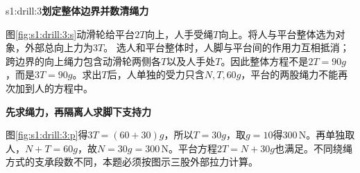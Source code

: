 \begin{drillsolution}{s1:drill:3}\textbf{划定整体边界并数清绳力}\par\nobreak
图\ref{fig:s1:drill:3:s}动滑轮给平台$2T$向上，人手受绳$T$向上。将人与平台整体选为对象，外部总向上力为$3T$。
选人和平台整体时，人脚与平台间的作用力互相抵消；跨边界的向上绳力包含动滑轮两侧各$T$以及人手处$T$。因此整体方程不是$2T=90g$，而是$3T=90g$。求出$T$后，人单独的受力只含$N,T,60g$，平台的两股绳力不能再次加到人的方程中。



\par\medskip{}\noindent\textbf{先求绳力，再隔离人求脚下支持力}\par\nobreak
图\ref{fig:s1:drill:3:p}得$3T=(60+30)g$，所以$T=30g$，取$g=10$得$300\,\mathrm N$。再单独取人，$N+T=60g$，故$N=30g=300\,\mathrm N$。平台方程$2T=N+30g$也满足。不同绕绳方式的支承段数不同，本题必须按图示三股外部拉力计算。\end{drillsolution}
